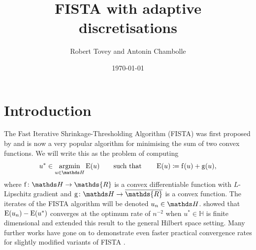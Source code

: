 \documentclass[10pt,a4paper,onecolumn]{article}
\author{Robert Tovey and Antonin Chambolle}
\date{\longdate\today}
\title{FISTA with adaptive discretisations}
\numberwithin{equation}{section}
\let\F\mathds\let\C\mathcal\newcommand{\R}{\F{R}}\newcommand{\A}{\C{A}}
\newcommand{\op}[1]{\operatorname{#1}}\newcommand{\overtext}[2]{\stackrel{\text{#1}}{#2}}
\renewcommand{\bar}{\overline}\renewcommand{\hat}{\widehat}\renewcommand{\tilde}{\widetilde}
\DeclareMathOperator*{\argmin}{argmin}\DeclareMathOperator{\TV}{TV}
\newcommand*{\Func}[1]{%
	\IfEqCase{#1}{%
		{0}{\op{E}}%
		{1}{\op{F}}%
		{2}{\op{G}}%
		{3}{\op{H}}%
	}[\op{F}#1]%
}
\newcommand*{\func}[1]{%
	\IfEqCase{#1}{%
		{0}{\op{e}}%
		{1}{\op{f}}%
		{2}{\op{g}}%
		{3}{\op{h}}%
	}[\op{f}#1]%
}
\newcommand*{\varf}[1]{%
	\IfEqCase{#1}{%
		{0}{u}%
		{1}{v}%
		{2}{w}%
	}[u#1]%
}
\begin{document}
	\maketitle


\section{Introduction}
The Fast Iterative Shrinkage-Thresholding Algorithm (FISTA) was first proposed by \citet{Beck2009} and is now a very popular algorithm for minimising the sum of two convex functions. We will write this as the problem of computing 
\begin{equation}\label{eq: min F = fD+fC}
	u^* \in \argmin_{\varf0\in\F H}\Func0(\varf0)  \qquad\text{such that}\qquad \Func0(\varf0)\coloneqq \func1(\varf0) + \func2(\varf0),
\end{equation}
where $\func1\colon\F H\to\R$ is a convex differentiable function with $L$-Lipschitz gradient and $\func2\colon\F H\to\bar\R$ is a convex function. The iterates of the FISTA algorithm will be denoted $\varf0_n\in\F H$. \citet{Beck2009} showed that $\Func0(\varf0_n) - \Func0(\varf0^*)$ converges at the optimum rate of $n^{-2}$ when $u^*\in \F H$ is finite dimensional and \cite{Chambolle2015} extended this result to the general Hilbert space setting. Many further works have gone on to demonstrate even faster practical convergence rates for slightly modified variants of FISTA \citep{Tao2016,Liang2017,Alamo2019}.
\end{document}
